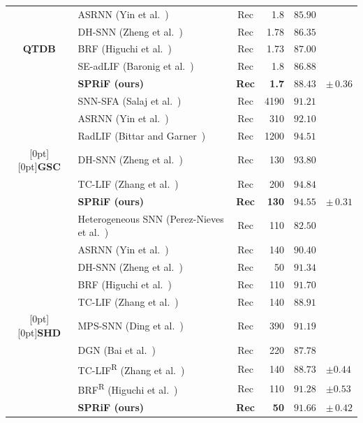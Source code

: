 \documentclass[letterpaper,journal]{IEEEtran}
\begin{document}
\begin{table}[!t]
\begin{tabular*}{\textwidth}{@{\extracolsep{\fill}}clcrr@{\extracolsep{0pt}\;}l@{}}
\midrule
 & ASRNN (Yin et al.~\cite{asrnn}) & Rec & 1.8 & $85.90$ & \\
 & DH-SNN (Zheng et al.~\cite{dhsnn}) & Rec & 1.78 & $86.35$ & \\
\textbf{QTDB} & BRF (Higuchi et al.~\cite{brf}) & Rec & 1.73 & $87.00$ & \\
 & SE-adLIF (Baronig et al.~\cite{adlif}) & Rec & 1.8 & $86.88$ & \\
 & \textbf{SPRiF (ours)} & \textbf{Rec} & \textbf{1.7} & $\mathbf{88.43}$ & $\boldsymbol{\pm}\,\mathbf{0.36}$\\
\midrule
 & SNN-SFA (Salaj et al.~\cite{snnsfa}) & Rec & 4190 & $91.21$ & \\
 & ASRNN (Yin et al.~\cite{asrnn}) & Rec & 310 & $92.10$ & \\
 & RadLIF (Bittar and Garner~\cite{radlif}) & Rec & 1200 & $94.51$ & \\
\raisebox{0.5\normalbaselineskip}[0pt][0pt]{\textbf{GSC}} & DH-SNN (Zheng et al.~\cite{dhsnn}) & Rec & 130 & $93.80$ & \\
 & TC-LIF (Zhang et al.~\cite{tclif}) & Rec & 200 & $94.84$ & \\
 & \textbf{SPRiF (ours)} & \textbf{Rec} & \textbf{130} & $\mathbf{94.55}$ & $\boldsymbol{\pm}\,\mathbf{0.31}$\\
\midrule
 & Heterogeneous SNN (Perez-Nieves et al.~\cite{heterogeneity}) & Rec & 110 & $82.50$ & \\
 & ASRNN (Yin et al.~\cite{asrnn}) & Rec & 140 & $90.40$ & \\
 & DH-SNN (Zheng et al.~\cite{dhsnn}) & Rec & 50 & $91.34$ & \\
 & BRF (Higuchi et al.~\cite{brf}) & Rec & 110 & $91.70$ & \\
 & TC-LIF (Zhang et al.~\cite{tclif}) & Rec & 140 & $88.91$ & \\
\raisebox{0.5\normalbaselineskip}[0pt][0pt]{\textbf{SHD}} & MPS-SNN (Ding et al.~\cite{mpssnn}) & Rec & 390 & $91.19$ & \\
 & DGN (Bai et al.~\cite{dgn}) & Rec & 220 & $87.78$ & \\
 & TC-LIF\textsuperscript{R} (Zhang et al.~\cite{tclif}) & Rec & 140 & $88.73$ & $\pm 0.44$\\
 & BRF\textsuperscript{R} (Higuchi et al.~\cite{brf}) & Rec & 110 & $91.28$ & $\pm 0.53$\\
 & \textbf{SPRiF (ours)} & \textbf{Rec} & \textbf{50} & $\mathbf{91.66}$ & $\boldsymbol{\pm}\,\mathbf{0.42}$\\
\bottomrule
\end{tabular*}

\end{table}
\end{document}
